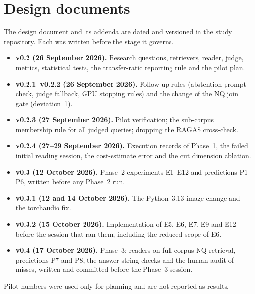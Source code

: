\section{Design documents}\label{app:prereg}
The design document and its addenda are dated and versioned in the study repository. Each was written before the stage it governs.
\begin{itemize}
\item \textbf{v0.2 (26 September 2026).} Research questions, retrievers, reader, judge, metrics, statistical tests, the transfer-ratio reporting rule and the pilot plan.
\item \textbf{v0.2.1--v0.2.2 (26 September 2026).} Follow-up rules (abstention-prompt check, judge fallback, GPU stopping rules) and the change of the NQ join gate (deviation~1).
\item \textbf{v0.2.3 (27 September 2026).} Pilot verification; the sub-corpus membership rule for all judged queries; dropping the RAGAS cross-check.
\item \textbf{v0.2.4 (27--29 September 2026).} Execution records of Phase~1, the failed initial reading session, the cost-estimate error and the cut dimension ablation.
\item \textbf{v0.3 (12 October 2026).} Phase~2 experiments E1--E12 and predictions P1--P6, written before any Phase~2 run.
\item \textbf{v0.3.1 (12 and 14 October 2026).} The Python~3.13 image change and the torchaudio fix.
\item \textbf{v0.3.2 (15 October 2026).} Implementation of E5, E6, E7, E9 and E12 before the session that ran them, including the reduced scope of E6.
\item \textbf{v0.4 (17 October 2026).} Phase~3: readers on full-corpus NQ retrieval, predictions P7 and P8, the answer-string checks and the human audit of misses, written and committed before the Phase~3 session.
\end{itemize}
Pilot numbers were used only for planning and are not reported as results.

